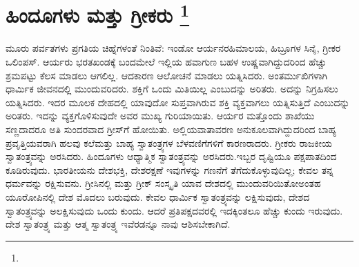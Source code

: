 
\chapter[ಹಿಂದೂಗಳು ಮತ್ತು ಗ್ರೀಕರು ]{ಹಿಂದೂಗಳು ಮತ್ತು ಗ್ರೀಕರು \protect\footnote{}}

ಮೂರು ಪರ್ವತಗಳು ಪ್ರಗತಿಯ ಚಿಹ್ನೆಗಳಂತೆ ನಿಂತಿವೆ: ಇಂಡೋ ಆರ್ಯನರ\break ಹಿಮಾಲಯ, ಹಿಬ್ರೂಗಳ ಸಿನೈ, ಗ್ರೀಕರ ಒಲಿಂಪಸ್​. ಆರ್ಯರು ಭರತಖಂಡಕ್ಕೆ ಬಂದಮೇಲೆ ಇಲ್ಲಿಯ ಹವಾಗುಣ ಬಹಳ ಉಷ್ಣವಾಗಿದ್ದುದರಿಂದ ಹೆಚ್ಚು ಶ್ರಮಪಟ್ಟು ಕೆಲಸ ಮಾಡಲು ಆಗಲಿಲ್ಲ. ಆದಕಾರಣ ಆಲೋಚನೆ ಮಾಡಲು ಯತ್ನಿಸಿದರು. ಅಂತರ್ಮುಖಿಗಳಾಗಿ ಧಾರ್ಮಿಕ ಜೀವನದಲ್ಲಿ ಮುಂದುವರಿದರು. ಶಕ್ತಿಗೆ ಒಂದು ಮಿತಿಯಿಲ್ಲ ಎಂಬುದನ್ನು ಅರಿತರು. ಅದನ್ನು ನಿಗ್ರಹಿಸಲು ಯತ್ನಿಸಿದರು. ಇದರ ಮೂಲಕ ದೇಹದಲ್ಲಿ ಯಾವುದೋ ಸುಪ್ತವಾಗಿರುವ ಶಕ್ತಿ ವ್ಯಕ್ತವಾಗಲು ಯತ್ನಿಸುತ್ತಿದೆ ಎಂಬುದನ್ನು ಅರಿತರು. ಇದನ್ನು ವ್ಯಕ್ತಗೊಳಿಸುವುದೇ ಅವರ ಮುಖ್ಯ ಗುರಿಯಾಯಿತು. ಆರ್ಯರ ಮತ್ತೊಂದು ಶಾಖೆಯು ಸಣ್ಣದಾದರೂ ಅತಿ ಸುಂದರವಾದ ಗ್ರೀಸ್​ಗೆ ಹೋಯಿತು. ಅಲ್ಲಿಯ\break ವಾತಾವರಣ ಅನುಕೂಲವಾಗಿದ್ದುದರಿಂದ ಬಾಹ್ಯ ಪ್ರವೃತ್ತಿಯವರಾಗಿ ಹಲವು ಕಲೆ\break ಮತ್ತು ಬಾಹ್ಯ ಸ್ವಾತಂತ್ರ್ಯಗಳ ಬೆಳವಣಿಗೆಗಳಿಗೆ ಕಾರಣರಾದರು. ಗ್ರೀಕರು ರಾಜಕೀಯ ಸ್ವಾತಂತ್ರ್ಯವನ್ನು ಅರಸಿದರು. ಹಿಂದೂಗಳು ಆಧ್ಯಾತ್ಮಿಕ ಸ್ವಾತಂತ್ರ್ಯವನ್ನು ಅರಸಿದರು.\break ಇಬ್ಬರ ದೃಷ್ಟಿಯೂ ಪಕ್ಷಪಾತದಿಂದ ಕೂಡಿರುವುದು. ಭಾರತೀಯನು ದೇಶಭಕ್ತಿ, ದೇಶರಕ್ಷಣೆ ಇವುಗಳನ್ನು ಗಣನೆಗೆ ತೆಗೆದುಕೊಳ್ಳುವುದಿಲ್ಲ; ಕೇವಲ ತನ್ನ ಧರ್ಮವನ್ನು ರಕ್ಷಿಸುವನು. ಗ್ರೀಸಿನಲ್ಲಿ ಮತ್ತು ಗ್ರೀಕ್​ ಸಂಸ್ಕೃತಿ ಯಾವ ದೇಶದಲ್ಲಿ ಮುಂದುವರಿಯಿತೋ\break ಅಂತಹ ಯೂರೋಪಿನಲ್ಲಿ ದೇಶ ಮೊದಲು ಬರುವುದು. ಕೇವಲ ಧಾರ್ಮಿಕ ಸ್ವಾತಂತ್ರ್ಯವನ್ನು ಲಕ್ಷಿಸುವುದು, ದೇಶದ ಸ್ವಾತಂತ್ರ್ಯವನ್ನು ಅಲಕ್ಷಿಸುವುದು ಒಂದು ಕುಂದು. ಆದರೆ ಪ್ರತಿಪಕ್ಷದವರಲ್ಲಿ ಇದಕ್ಕಿಂತಲೂ ಹೆಚ್ಚು ಕುಂದು ಇರುವುದು. ದೇಶ ಸ್ವಾತಂತ್ರ್ಯ ಮತ್ತು ಆತ್ಮ ಸ್ವಾತಂತ್ರ್ಯ ಇವೆರಡನ್ನೂ ನಾವು ಆಶಿಸಬೇಕಾಗಿದೆ.

